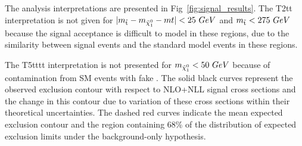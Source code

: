 The analysis interpretations are presented in Fig~\ref{fig:signal_results}. The T2tt interpretation is not given for $|m_{\tilde{{\mathrm t}}}-m_{\tilde{\chi}^{0}_{1}}-m{t}|<25~GeV$ and $m_{\tilde{{\mathrm t}}}<275~GeV$ because the signal acceptance is difficult to model in these regions, due to the similarity between signal events and the standard model \ttbar events in these regions. 

The T5tttt interpretation is not presented for $m_{\tilde{\chi}^{0}_{1}}<50~GeV$ because of contamination from SM \ttbar events with fake \MET.
The solid black curves represent the observed exclusion contour with respect to NLO+NLL signal cross sections and the change in this contour due to variation of these cross sections within their theoretical uncertainties\cite{Borschensky:2014cia}. The dashed red curves indicate the mean expected exclusion contour and the region containing 68\% of the distribution of expected exclusion limits under the background-only hypothesis. 

